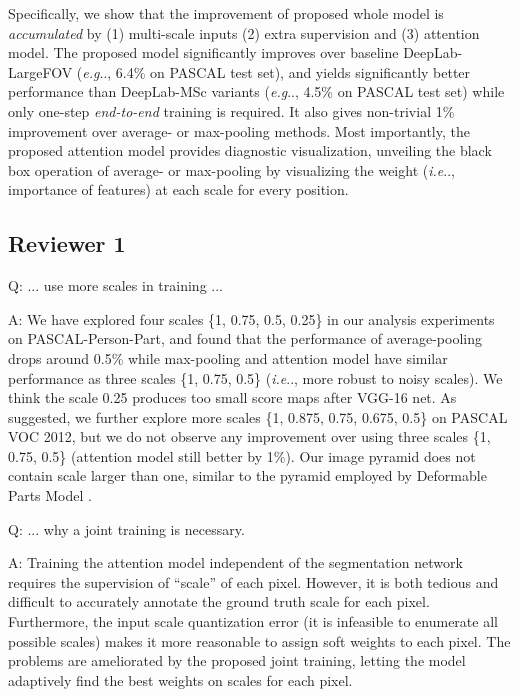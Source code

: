 \documentclass[10pt,twocolumn,letterpaper]{article}
\makeatletter
\def\@onedot{\ifx\@let@token.\else.\null\fi\xspace}
\DeclareRobustCommand\onedot{\futurelet\@let@token\@onedot}
\def\eg{\emph{e.g}\onedot} \def\Eg{\emph{E.g}\onedot}
\def\ie{\emph{i.e}\onedot} \def\Ie{\emph{I.e}\onedot}
\makeatother
\begin{document}
Specifically, we show that the improvement of proposed whole model is {\it accumulated} by (1) multi-scale inputs (2) extra supervision and (3) attention model. The proposed model significantly improves over baseline DeepLab-LargeFOV (\eg, 6.4\% on PASCAL test set), and yields significantly better performance than DeepLab-MSc variants (\eg, 4.5\% on PASCAL test set) while only one-step {\it end-to-end} training is required. It also gives non-trivial 1\% improvement over average- or max-pooling methods.
Most importantly, the proposed attention model provides diagnostic visualization, unveiling the black box operation of average- or max-pooling by visualizing the weight (\ie, importance of features) at each scale for every position.

\vspace{-0.17cm}
\subsection{Reviewer 1}
\vspace{-0.17cm}
Q: ... use more scales in training ...

A: We have explored four scales \{1, 0.75, 0.5, 0.25\} in our analysis experiments on PASCAL-Person-Part, and found that the performance of average-pooling drops around 0.5\% while max-pooling and attention model have similar performance as three scales \{1, 0.75, 0.5\} (\ie, more robust to noisy scales). We think the scale {0.25} produces too small score maps after VGG-16 net.  As suggested, we further explore more scales \{1, 0.875, 0.75, 0.675, 0.5\} on PASCAL VOC 2012, but we do not observe any improvement over using three scales \{1, 0.75, 0.5\} (attention model still better by 1\%). Our image pyramid does not contain scale larger than one, similar to the pyramid employed by Deformable Parts Model \cite{felzenszwalb2010object}.

Q: ... why a joint training is necessary.

A: Training the attention model independent of the segmentation network requires the supervision of ``scale'' of each pixel. However, it is both tedious and difficult to accurately annotate the ground truth scale for each pixel. Furthermore, the input scale quantization error (it is infeasible to enumerate all possible scales) makes it more reasonable to assign soft weights to each pixel. The problems are ameliorated by the proposed joint training, letting the model adaptively find the best weights on scales
for each pixel.
\end{document}
